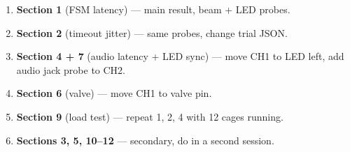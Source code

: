 \documentclass[11pt, a4paper]{article}
\begin{document}
\begin{enumerate}[noitemsep]
    \item \textbf{Section 1} (FSM latency) --- main result, beam + LED probes.
    \item \textbf{Section 2} (timeout jitter) --- same probes, change trial JSON.
    \item \textbf{Section 4 + 7} (audio latency + LED sync) --- move CH1 to LED
          left, add audio jack probe to CH2.
    \item \textbf{Section 6} (valve) --- move CH1 to valve pin.
    \item \textbf{Section 9} (load test) --- repeat 1, 2, 4 with 12 cages running.
    \item \textbf{Sections 3, 5, 10--12} --- secondary, do in a second session.
\end{enumerate}
\end{document}
